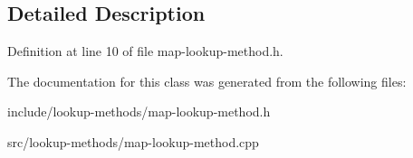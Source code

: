 \subsection{Detailed Description}


Definition at line 10 of file map-\/lookup-\/method.\+h.



The documentation for this class was generated from the following files\+:\begin{DoxyCompactItemize}
\item 
include/lookup-\/methods/map-\/lookup-\/method.\+h\item 
src/lookup-\/methods/map-\/lookup-\/method.\+cpp\end{DoxyCompactItemize}
